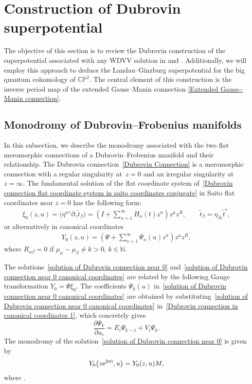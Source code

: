 \documentclass[pdftex]{sigma}
\numberwithin{equation}{section}
\begin{document}
\section{Construction of Dubrovin superpotential}\label{Construction of Dubrovin superpotential}

The objective of this section is to review the Dubrovin construction of the superpotential associated with any WDVV solution in \cite[Appendix J]{B.Dubrovin2} and \cite[Chapter 5]{B.Dubrovin3}. Additionally, we will employ this approach to deduce the Landau--Ginzburg superpotential for the big quantum cohomology of $\mathbb{CP}^2$. The central element of this construction is the inverse period map of the extended Gauss--Manin connection \eqref{Extended Gauss--Manin connection}.

\subsection{Monodromy of Dubrovin--Frobenius manifolds}

In this subsection, we describe the monodromy associated with the two flat meromorphic connections of a Dubrovin--Frobenius manifold and their relationship.
The Dubrovin connection~\eqref{Dubrovin Connection} is a meromorphic connection with a regular singularity at~${z=0}$ and an irregular singularity at $z=\infty$. The fundamental solution of the flat coordinate system of~\eqref{Dubrovin connection flat coordinate system in saito coordinates conjugate} in Saito flat coordinates near $z=0$ has the following form:
\begin{gather}
 \xi_0(z,u)=\bigl(\eta^{\alpha\gamma}\partial_{\gamma}\tilde t_{\beta}\bigr)=\left(I+\sum_{n=1}^{\infty}H_n(t)z^n \right)z^{\mu}z^R, \qquad \tilde t_{\beta}=\eta_{\beta\epsilon}\tilde t^{\epsilon},\label{solution of Dubrovin connection near 0}
\end{gather}
or alternatively in canonical coordinates
\begin{gather}\label{solution of Dubrovin connection near 0 canonical coordinates}
 Y_0(z,u)=\left(\Psi+\sum_{n=1}^{\infty}\Psi_n(u)z^n \right)z^{\mu}z^R,
\end{gather}
where $R_{\alpha\beta}=0$ if $\mu_{\alpha}-\mu_{\beta} \neq k>0$, $k\in \mathbb{N}$.

The solutions~\eqref{solution of Dubrovin connection near 0} and~\eqref{solution of Dubrovin connection near 0 canonical coordinates} are related by the following Gauge transformation
$ Y_0=\Psi \xi_0$.
The coefficients $\Psi_k(u)$ in~\eqref{solution of Dubrovin connection near 0 canonical coordinates} are obtained by substituting~\eqref{solution of Dubrovin connection near 0 canonical coordinates} in~\eqref{Dubrovin connection in canonical coordinates 1}, which concretely gives
\[
 \frac{\partial \Psi_k}{\partial u_i}=E_i\Psi_{k-1}+V_i\Psi_k.
 \]
The monodromy of the solution~\eqref{solution of Dubrovin connection near 0} is given by
\[
Y_0\bigl(z{\rm e}^{2\pi {\rm i}},u\bigr)=Y_0(z,u)M,
\]
 where .
\end{document}
